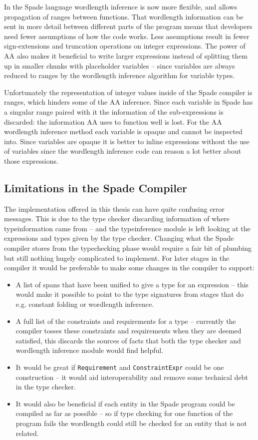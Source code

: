 In the Spade language wordlength inference is now more flexible, and allows propagation of ranges between functions. That wordlength information can be sent in more detail between different parts of the program means that developers need fewer assumptions of how the code works. Less assumptions result in fewer sign-extensions and truncation operations on integer expressions. The power of AA also makes it beneficial to write larger expressions instead of splitting them up in smaller chunks with placeholder variables -- since variables are always reduced to ranges by the wordlength inference algorithm for variable types.

Unfortunately the representation of integer values inside of the Spade compiler is ranges, which hinders some of the AA inference. Since each variable in Spade has a singular range paired with it the information of the sub-expressions is discarded: the information AA uses to function well is lost. For the AA wordlength inference method each variable is opaque and cannot be inspected into. Since variables are opaque it is better to inline expressions without the use of variables since the wordlength inference code can reason a lot better about those expressions.

\subsection{Limitations in the Spade Compiler}
The implementation offered in this thesis can have quite confusing error messages. This is due to the type checker discarding information of where typeinformation came from -- and the typeinference module is left looking at the expressions and types given by the type checker. Changing what the Spade compiler stores from the typechecking phase would require a fair bit of plumbing but still nothing hugely complicated to implement. For later stages in the compiler it would be preferable to make some changes in the compiler to support:
\begin{itemize}
  \item A list of spans that have been unified to give a type for an expression -- this would make it possible to point to the type signatures from stages that do e.g. constant folding or wordlength inference.
  \item A full list of the constraints and requirements for a type -- currently the compiler tosses these constraints and requirements when they are deemed satisfied, this discards the sources of facts that both the type checker and wordlength inference module would find helpful.
  \item It would be great if \verb+Requirement+ and \verb+ConstraintExpr+ could be one construction -- it would aid interoperability and remove some technical debt in the type checker.
  \item It would also be beneficial if each entity in the Spade program could be compiled as far as possible -- so if type checking for one function of the program fails the wordlength could still be checked for an entity that is not related.
\end{itemize}

